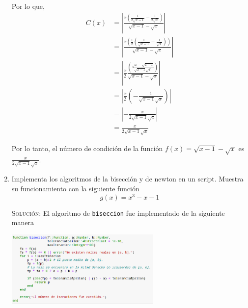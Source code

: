 \documentclass[letterpaper,11pt]{article}
\begin{document}
\begin{enumerate}
    Por lo que, 
    \begin{align*}
        C(x) &= \left| \frac{x \left(\frac{1}{2 \sqrt{x - 1}} - 
                                     \frac{1}{2 \sqrt{x}}\right)}
                            {\sqrt{x - 1} - \sqrt{x}} \right| \\ 
             &= \left| \frac{x \left(\frac{1}{2} 
                                     \left(\frac{1}{\sqrt{x - 1}} - 
                                           \frac{1}{\sqrt{x}}\right) \right)}
                            {\sqrt{x - 1} - \sqrt{x}} \right| \\ 
             &= \left| \frac{x}{2} \frac{\left(\frac{\sqrt{x} - \sqrt{x-1}}
                                                    {\sqrt{x-1} \sqrt{x}}\right)}
                            {\sqrt{x - 1} - \sqrt{x}} \right| \\ 
             &= \left| \frac{x}{2} \left(- \frac{1}
                                                {\sqrt{x - 1} \sqrt{x}}\right) \right| \\ 
             &= \left|- \frac{x}{2 \sqrt{x - 1} \sqrt{x}} \right| \\ 
             &= \frac{x}{2 \sqrt{x - 1} \sqrt{x}} 
    \end{align*}

    Por lo tanto, el número de condición de la función 
    $f(x) = \sqrt{x - 1} - \sqrt{x}$ es $\frac{x}{2 \sqrt{x - 1} \sqrt{x}}$. 

    \item Implementa los algoritmos de la bisección y de newton en un 
    script. Muestra su funcionamiento con la siguiente función 
    \begin{equation*}
        g(x) = x^3 - x - 1
    \end{equation*}

    \textsc{Solución:} El algoritmo de \texttt{biseccion} fue implementado de 
    la siguiente manera
    \begin{center}
        \includegraphics[width=0.6\textwidth]{imagenes/biseccion.png}
    \end{center}


\end{enumerate}
\end{document}
